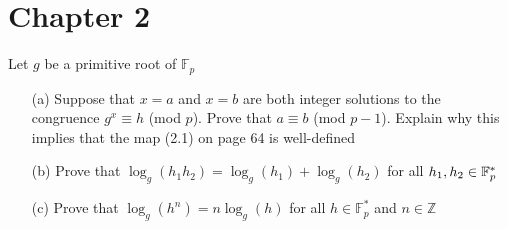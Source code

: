 \chapter*{Chapter 2}
\begin{exer}[2.3]
Let $g$ be a primitive root of $\mathbb{F}_p$

\begin{enumerate}
    \item[(a)] Suppose that $x = a$ and $x = b$ are both integer solutions to the congruence $g^x \equiv h$ (mod $p$). Prove that $a \equiv b$ (mod $p-1$). Explain why this implies that the map (2.1) on page 64 is well-defined
    \item[(b)] Prove that $\log_g(h_1 h_2) = \log_g(h_1) + \log_g(h_2)$ for all $h_1, h_2 \in \mathbb{F}^*_p$
    \item[(c)] Prove that $\log_g(h^n) = n\log_g(h)$ for all $h \in \mathbb{F}^{*}_p$ and $n \in \mathbb{Z}$
\end{enumerate}
\end{exer}


